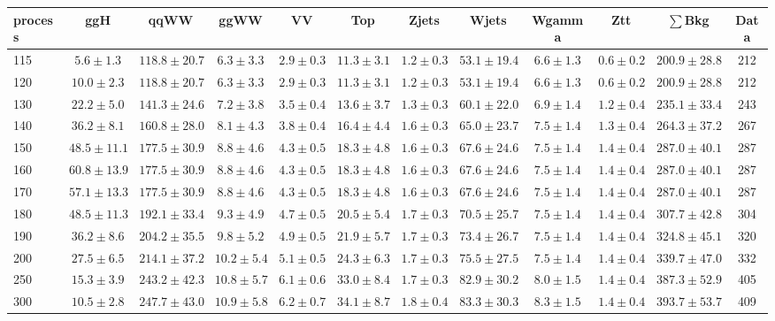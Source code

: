 \begin{table}
{\tiny
 \begin{center}
 \begin{tabular}{l c c c c c c c c c c c }
 \hline
 process & ggH & qqWW & ggWW & VV & Top & Zjets & Wjets & Wgamma & Ztt & $\sum$Bkg & Data \\
 \hline
115 & $5.6\pm1.3$ & $118.8\pm20.7$ & $6.3\pm3.3$ & $2.9\pm0.3$ & $11.3\pm3.1$ & $1.2\pm0.3$ & $53.1\pm19.4$ & $6.6\pm1.3$ & $0.6\pm0.2$ & $200.9\pm28.8$ & 212 \\
120 & $10.0\pm2.3$ & $118.8\pm20.7$ & $6.3\pm3.3$ & $2.9\pm0.3$ & $11.3\pm3.1$ & $1.2\pm0.3$ & $53.1\pm19.4$ & $6.6\pm1.3$ & $0.6\pm0.2$ & $200.9\pm28.8$ & 212 \\
130 & $22.2\pm5.0$ & $141.3\pm24.6$ & $7.2\pm3.8$ & $3.5\pm0.4$ & $13.6\pm3.7$ & $1.3\pm0.3$ & $60.1\pm22.0$ & $6.9\pm1.4$ & $1.2\pm0.4$ & $235.1\pm33.4$ & 243 \\
140 & $36.2\pm8.1$ & $160.8\pm28.0$ & $8.1\pm4.3$ & $3.8\pm0.4$ & $16.4\pm4.4$ & $1.6\pm0.3$ & $65.0\pm23.7$ & $7.5\pm1.4$ & $1.3\pm0.4$ & $264.3\pm37.2$ & 267 \\
150 & $48.5\pm11.1$ & $177.5\pm30.9$ & $8.8\pm4.6$ & $4.3\pm0.5$ & $18.3\pm4.8$ & $1.6\pm0.3$ & $67.6\pm24.6$ & $7.5\pm1.4$ & $1.4\pm0.4$ & $287.0\pm40.1$ & 287 \\
160 & $60.8\pm13.9$ & $177.5\pm30.9$ & $8.8\pm4.6$ & $4.3\pm0.5$ & $18.3\pm4.8$ & $1.6\pm0.3$ & $67.6\pm24.6$ & $7.5\pm1.4$ & $1.4\pm0.4$ & $287.0\pm40.1$ & 287 \\
170 & $57.1\pm13.3$ & $177.5\pm30.9$ & $8.8\pm4.6$ & $4.3\pm0.5$ & $18.3\pm4.8$ & $1.6\pm0.3$ & $67.6\pm24.6$ & $7.5\pm1.4$ & $1.4\pm0.4$ & $287.0\pm40.1$ & 287 \\
180 & $48.5\pm11.3$ & $192.1\pm33.4$ & $9.3\pm4.9$ & $4.7\pm0.5$ & $20.5\pm5.4$ & $1.7\pm0.3$ & $70.5\pm25.7$ & $7.5\pm1.4$ & $1.4\pm0.4$ & $307.7\pm42.8$ & 304 \\
190 & $36.2\pm8.6$ & $204.2\pm35.5$ & $9.8\pm5.2$ & $4.9\pm0.5$ & $21.9\pm5.7$ & $1.7\pm0.3$ & $73.4\pm26.7$ & $7.5\pm1.4$ & $1.4\pm0.4$ & $324.8\pm45.1$ & 320 \\
200 & $27.5\pm6.5$ & $214.1\pm37.2$ & $10.2\pm5.4$ & $5.1\pm0.5$ & $24.3\pm6.3$ & $1.7\pm0.3$ & $75.5\pm27.5$ & $7.5\pm1.4$ & $1.4\pm0.4$ & $339.7\pm47.0$ & 332 \\
250 & $15.3\pm3.9$ & $243.2\pm42.3$ & $10.8\pm5.7$ & $6.1\pm0.6$ & $33.0\pm8.4$ & $1.7\pm0.3$ & $82.9\pm30.2$ & $8.0\pm1.5$ & $1.4\pm0.4$ & $387.3\pm52.9$ & 405 \\
300 & $10.5\pm2.8$ & $247.7\pm43.0$ & $10.9\pm5.8$ & $6.2\pm0.7$ & $34.1\pm8.7$ & $1.8\pm0.4$ & $83.3\pm30.3$ & $8.3\pm1.5$ & $1.4\pm0.4$ & $393.7\pm53.7$ & 409 \\

\end{tabular}
\end{center}}
\end{table}

